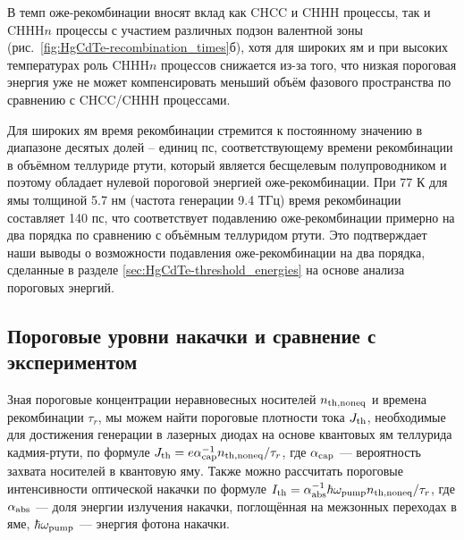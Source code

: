 В темп оже-рекомбинации вносят вклад как CHCC и CHHH процессы, так и CHHH$n$ процессы с участием различных подзон валентной зоны (рис.~\ref{fig:HgCdTe-recombination_times}б), хотя для широких ям и при высоких температурах роль  CHHH$n$ процессов снижается из-за того, что низкая пороговая энергия уже не может компенсировать меньший объём фазового пространства по сравнению с CHCC/CHHH процессами.

Для широких ям время рекомбинации стремится к постоянному значению в диапазоне десятых долей -- единиц пс, соответствующему времени рекомбинации в объёмном теллуриде ртути, который является бесщелевым полупроводником и поэтому обладает нулевой пороговой энергией оже-рекомбинации. При 77 К для ямы толщиной 5.7 нм (частота генерации 9.4 ТГц) время рекомбинации составляет 140 пс, что соответствует подавлению оже-рекомбинации примерно на два порядка по сравнению с объёмным теллуридом ртути. Это подтверждает наши выводы о возможности подавления оже-рекомбинации на два порядка, сделанные в разделе \ref{sec:HgCdTe-threshold_energies} на основе анализа пороговых энергий.

\subsection{Пороговые уровни накачки и сравнение с экспериментом} \label{sec:HgCdTe-currents}
Зная пороговые концентрации неравновесных носителей $n_{\rm th, noneq}$ и времена рекомбинации $\tau_r$, мы можем найти пороговые плотности тока $J_{\rm th}$, необходимые для достижения генерации в лазерных диодах на основе квантовых ям теллурида кадмия-ртути, по формуле $J_{\rm th} = e \alpha^{-1}_{\rm cap} n_{\rm th, noneq}/\tau_r$, где $\alpha_{\rm cap}$ --- вероятность захвата носителей в квантовую яму. Также можно рассчитать пороговые интенсивности оптической накачки по формуле $I_{\rm th} = \alpha_{\rm abs}^{-1} \hbar \omega_{\rm pump} n_{\rm th, noneq}/\tau_r$, где $\alpha_{\rm abs}$ --- доля энергии излучения накачки, поглощённая на межзонных переходах в яме, $\hbar \omega_{\rm pump}$ --- энергия фотона накачки.

